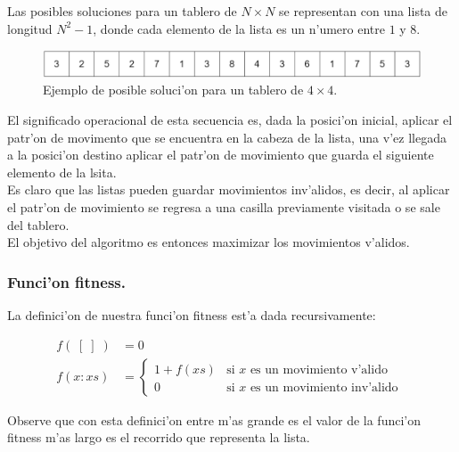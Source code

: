 \documentclass[12pt]{article}
\begin{document}
    Las posibles  soluciones para un tablero de $N \times N$
    se representan con una lista de longitud $N^{2} -1 $, donde
    cada elemento de la lista es un n'umero entre $1$ y $8$.

    \begin{figure}[H]
        \centering
        \includegraphics[scale=0.3]{food_source1.png}
        \caption{Ejemplo de posible soluci'on para un tablero de $4\times 4$.}
        \label{fig:food_source1}
    \end{figure}

    El significado operacional de esta secuencia es, dada la posici'on inicial, aplicar el patr'on de movimento
    que se encuentra en la cabeza de la lista, una v'ez llegada a la posici'on destino aplicar el
    patr'on de movimiento que guarda el siguiente elemento de la lsita. \\
    Es claro que las listas pueden guardar movimientos inv'alidos, es decir, al aplicar
    el patr'on de movimiento se regresa a una casilla previamente visitada o se sale del tablero. \\
    El objetivo del algoritmo es entonces maximizar los movimientos v'alidos.


    \subsubsection{Funci'on fitness.}

    La definici'on de nuestra funci'on fitness est'a dada recursivamente:

    \begin{equation} \label{eq: fitness}
        \begin{split}
            f(\; [\;] \;) &= 0 \\
            f( x:xs ) &= \begin{cases}
                            1 + f(xs) &\text{si $x$ es un movimiento v'alido}\\
                            0 &\text{si $x$ es un movimiento inv'alido }
            \end{cases}
        \end{split}
    \end{equation}

    Observe que con esta definici'on entre m'as grande es el valor de la funci'on fitness m'as
    largo es el recorrido que representa la lista.
\end{document}
